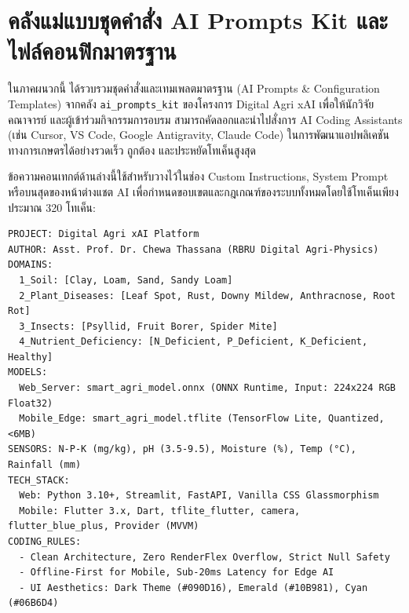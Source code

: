 
\chapter{คลังแม่แบบชุดคำสั่ง AI Prompts Kit และไฟล์คอนฟิกมาตรฐาน}
\label{app:prompts_catalog}

ในภาคผนวกนี้ ได้รวบรวมชุดคำสั่งและเทมเพลตมาตรฐาน (AI Prompts \& Configuration Templates) จากคลัง \texttt{ai\_prompts\_kit} ของโครงการ Digital Agri xAI เพื่อให้นักวิจัย คณาจารย์ และผู้เข้าร่วมกิจกรรมการอบรม สามารถคัดลอกและนำไปสั่งการ AI Coding Assistants (เช่น Cursor, VS Code, Google Antigravity, Claude Code) ในการพัฒนาแอปพลิเคชันทางการเกษตรได้อย่างรวดเร็ว ถูกต้อง และประหยัดโทเค็นสูงสุด


ข้อความคอนเทกต์ด้านล่างนี้ใช้สำหรับวางไว้ในช่อง Custom Instructions, System Prompt หรือบนสุดของหน้าต่างแชต AI เพื่อกำหนดขอบเขตและกฎเกณฑ์ของระบบทั้งหมดโดยใช้โทเค็นเพียงประมาณ 320 โทเค็น:

\begin{tcolorbox}[colback=black!92,colframe=teal!80!black,arc=2mm,boxrule=0.6pt]
\color{white}\fontsize{8.5}{11}\selectfont
\begin{verbatim}
PROJECT: Digital Agri xAI Platform
AUTHOR: Asst. Prof. Dr. Chewa Thassana (RBRU Digital Agri-Physics)
DOMAINS:
  1_Soil: [Clay, Loam, Sand, Sandy Loam]
  2_Plant_Diseases: [Leaf Spot, Rust, Downy Mildew, Anthracnose, Root Rot]
  3_Insects: [Psyllid, Fruit Borer, Spider Mite]
  4_Nutrient_Deficiency: [N_Deficient, P_Deficient, K_Deficient, Healthy]
MODELS:
  Web_Server: smart_agri_model.onnx (ONNX Runtime, Input: 224x224 RGB Float32)
  Mobile_Edge: smart_agri_model.tflite (TensorFlow Lite, Quantized, <6MB)
SENSORS: N-P-K (mg/kg), pH (3.5-9.5), Moisture (%), Temp (°C), Rainfall (mm)
TECH_STACK:
  Web: Python 3.10+, Streamlit, FastAPI, Vanilla CSS Glassmorphism
  Mobile: Flutter 3.x, Dart, tflite_flutter, camera, flutter_blue_plus, Provider (MVVM)
CODING_RULES:
  - Clean Architecture, Zero RenderFlex Overflow, Strict Null Safety
  - Offline-First for Mobile, Sub-20ms Latency for Edge AI
  - UI Aesthetics: Dark Theme (#090D16), Emerald (#10B981), Cyan (#06B6D4)
\end{verbatim}
\end{tcolorbox}

